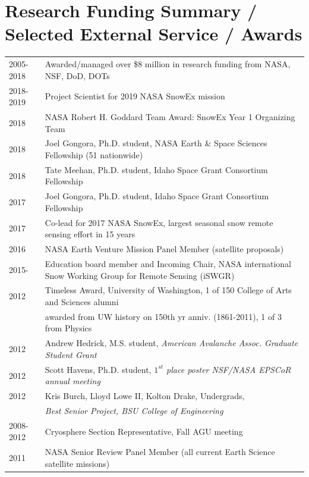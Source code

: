 \documentclass[11pt]{article}
\renewcommand\arraystretch{1}
\begin{document}
\pagebreak

\section*{Research Funding Summary / Selected External Service / Awards}
\begingroup
\renewcommand\arraystretch{1}
\begin{longtable}{p{0.7in}|p{5.7in}}
2005-2018 & Awarded/managed over \$8 million in research funding from NASA, NSF, DoD, DOTs \\ 
2018-2019 & Project Scientist for 2019 NASA SnowEx mission \\
2018 & NASA Robert H. Goddard Team Award: SnowEx Year 1 Organizing Team \\
2018 & Joel Gongora, Ph.D. student, NASA Earth \& Space Sciences Fellowship (51 nationwide) \\
2018 & Tate Meehan, Ph.D. student, Idaho Space Grant Consortium Fellowship \\
2017 & Joel Gongora, Ph.D. student, Idaho Space Grant Consortium Fellowship \\
2017 & Co-lead for 2017 NASA SnowEx, largest seasonal snow remote sensing effort in 15 years \\
2016 & NASA Earth Venture Mission Panel Member (satellite proposals) \\
2015- & Education board member and Incoming Chair, NASA international Snow Working Group for Remote Sensing (iSWGR) \\
2012 & Timeless Award, University of Washington, 1 of 150 College of Arts and Sciences alumni  \\
& awarded from UW history on 150th yr anniv. (1861-2011), 1 of 3 from Physics \\
2012 & Andrew Hedrick, M.S. student, \textit{American Avalanche Assoc. Graduate Student Grant} \\
2012 & Scott Havens, Ph.D. student, \textit{$1^{st}$ place poster NSF/NASA EPSCoR annual meeting} \\
2012 & Kris Burch, Lloyd Lowe II, Kolton Drake, Undergrads, \\ 
& \textit{Best Senior Project, BSU College of Engineering} \\
2008-2012 & Cryosphere Section Representative, Fall AGU meeting \\
2011 & NASA Senior Review Panel Member (all current Earth Science satellite missions)
\end{longtable}
\endgroup
\end{document}

